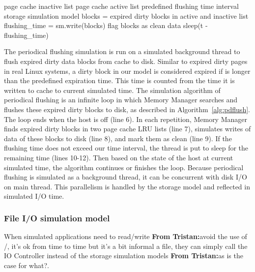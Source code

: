 \documentclass[conference]{IEEEtran}
\newcommand{\Desc}[2]{\State \makebox[2em][l]{#1}#2}
\newcommand{\tristan}[1]{\color{orange}\textbf{From Tristan:}#1\color{black}}
\newcommand{\english}[1]{\uwave{#1}}
\begin{document}
			\begin{algorithm}\caption{Periodical flushing simulation \tristan{expiration time could be aded as a parameter}}\label{alg:pdflush}
				\small
				\begin{algorithmic}[1]
					\Input
        				\Desc{in}{page cache inactive list}
        				\Desc{ac}{page cache active list}
						\Desc{t}{predefined flushing time interval}
						\Desc{sm}{storage simulation model}
   					\EndInput
						\State blocks = expired dirty blocks in active and inactive list
						\State flushing\_time = sm.write(blocks)
						\State flag blocks as clean data
							\State sleep(t - flushing\_time)
						\EndIf
					\EndWhile
				\end{algorithmic}
			\end{algorithm}				
			
			The periodical flushing simulation is run on a simulated background thread 
			to flush expired dirty data blocks from cache to disk.
			Similar to expired dirty pages in real Linux systems, a dirty block in our model 
			is considered expired if \english{the time it remains in cache as dirty} is longer than 
			the predefined expiration time. This time is counted from the time it is written 
			to cache to current simulated time. 
			The simulation algorithm of periodical flushing is an infinite loop in which 
			Memory Manager searches and flushes these expired dirty blocks to disk, 
			as described in Algorithm~\ref{alg:pdflush}. 
			The loop ends when the host is off (line 6). 
			In each repetition, Memory Manager finds expired dirty blocks in two 
			page cache LRU lists (line 7), simulates writes of data of these blocks 
			to disk (line 8), and mark them as clean (line 9).
			If the flushing time does not exceed our time interval, the thread is put 
			to sleep for the remaining time (lines 10-12). 
			Then based on the state of the host at current simulated time, 
			the algorithm continues or finishes the loop.
			Because periodical flushing is simulated as a background thread, it can be 
			concurrent with disk I/O on main thread. This parallelism is handled by the 
			storage model and reflected in simulated I/O time.

			\subsubsection{File I/O simulation model}
			 
			When simulated applications need to read/write \tristan{avoid the use of /, it's ok from time to time but it's a bit informal}
			 a file, they can simply call 
			the IO Controller instead of the storage simulation models \tristan{as is the case for what?}. 
			
\end{document}
